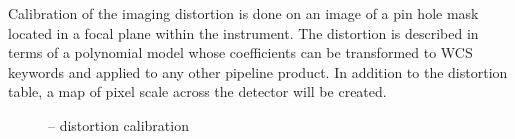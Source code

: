 Calibration of the imaging distortion is done on an image of a pin
hole mask located in a focal plane within the instrument. The
distortion is described in terms of a polynomial model whose
coefficients can be transformed to WCS keywords and applied to any
other pipeline product. In addition to the distortion table, a map of
pixel scale across the detector will be created.



\begin{figure}[hb]
    \centering
    \def \globalscale {0.700000}
    \fontsize{10}{12}\selectfont
    
  \caption[Recipe: ]{%
     --  distortion calibration}
  \label{fig:metis_n_img_distortion}
\end{figure}
\restoregeometry

